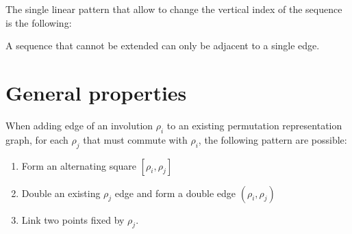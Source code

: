 \begin{proposition}
  \label{linear-pattern}
  The single linear pattern that allow to change the vertical index of the sequence is the following:

  \begin{figure}[H]
    \begin{center}
      \caption{}
    \end{center}
  \end{figure}

\end{proposition}

\begin{corollary}
  \label{sequence-connection}
  A sequence that cannot be extended can only be adjacent to a single edge.
\end{corollary}

\section{General properties}

\begin{proposition}
  \label{patterns-adding}
  When adding edge of an involution $\rho_i$ to an existing permutation representation graph, for each $\rho_j$ that must commute with $\rho_i$, the following pattern are possible:
  \begin{enumerate}
    \item Form an alternating square $[\rho_i, \rho_j]$
    \item Double an existing $\rho_j$ edge and form a double edge $(\rho_i, \rho_j)$
    \item Link two points fixed by $\rho_j$.
  \end{enumerate}
\end{proposition}
